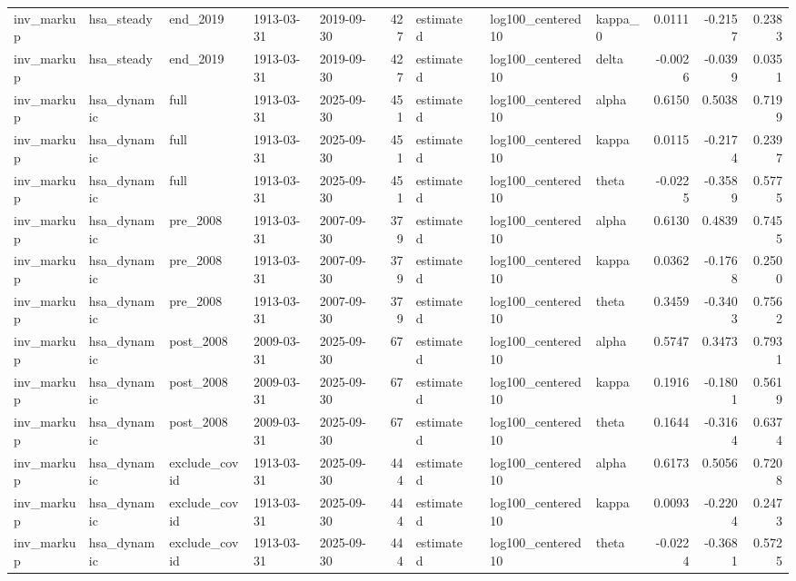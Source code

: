\begin{tabular}{lllllrllllrrr}
inv\_markup & hsa\_steady & end\_2019 & 1913-03-31 & 2019-09-30 & 427 & estimated &  & log100\_centered10 & kappa\_0 & 0.0111 & -0.2157 & 0.2383 \\
inv\_markup & hsa\_steady & end\_2019 & 1913-03-31 & 2019-09-30 & 427 & estimated &  & log100\_centered10 & delta & -0.0026 & -0.0399 & 0.0351 \\
inv\_markup & hsa\_dynamic & full & 1913-03-31 & 2025-09-30 & 451 & estimated &  & log100\_centered10 & alpha & 0.6150 & 0.5038 & 0.7199 \\
inv\_markup & hsa\_dynamic & full & 1913-03-31 & 2025-09-30 & 451 & estimated &  & log100\_centered10 & kappa & 0.0115 & -0.2174 & 0.2397 \\
inv\_markup & hsa\_dynamic & full & 1913-03-31 & 2025-09-30 & 451 & estimated &  & log100\_centered10 & theta & -0.0225 & -0.3589 & 0.5775 \\
inv\_markup & hsa\_dynamic & pre\_2008 & 1913-03-31 & 2007-09-30 & 379 & estimated &  & log100\_centered10 & alpha & 0.6130 & 0.4839 & 0.7455 \\
inv\_markup & hsa\_dynamic & pre\_2008 & 1913-03-31 & 2007-09-30 & 379 & estimated &  & log100\_centered10 & kappa & 0.0362 & -0.1768 & 0.2500 \\
inv\_markup & hsa\_dynamic & pre\_2008 & 1913-03-31 & 2007-09-30 & 379 & estimated &  & log100\_centered10 & theta & 0.3459 & -0.3403 & 0.7562 \\
inv\_markup & hsa\_dynamic & post\_2008 & 2009-03-31 & 2025-09-30 & 67 & estimated &  & log100\_centered10 & alpha & 0.5747 & 0.3473 & 0.7931 \\
inv\_markup & hsa\_dynamic & post\_2008 & 2009-03-31 & 2025-09-30 & 67 & estimated &  & log100\_centered10 & kappa & 0.1916 & -0.1801 & 0.5619 \\
inv\_markup & hsa\_dynamic & post\_2008 & 2009-03-31 & 2025-09-30 & 67 & estimated &  & log100\_centered10 & theta & 0.1644 & -0.3164 & 0.6374 \\
inv\_markup & hsa\_dynamic & exclude\_covid & 1913-03-31 & 2025-09-30 & 444 & estimated &  & log100\_centered10 & alpha & 0.6173 & 0.5056 & 0.7208 \\
inv\_markup & hsa\_dynamic & exclude\_covid & 1913-03-31 & 2025-09-30 & 444 & estimated &  & log100\_centered10 & kappa & 0.0093 & -0.2204 & 0.2473 \\
inv\_markup & hsa\_dynamic & exclude\_covid & 1913-03-31 & 2025-09-30 & 444 & estimated &  & log100\_centered10 & theta & -0.0224 & -0.3681 & 0.5725 \\

\end{tabular}
